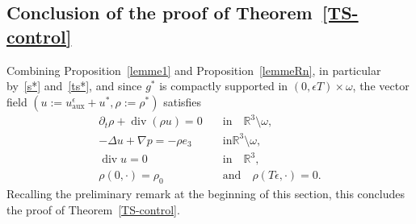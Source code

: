 \documentclass[10pt]{amsart}
\theoremstyle{definition}\newtheorem{defi}[theo]{Definition}\newtheorem{rema}[theo]{Remark}\newtheorem{exam}[theo]{Example}\newtheorem{exem}[theo]{Example}\newtheorem{nota}[theo]{Notation}
\newcommand{\aux}{\mathrm{aux}}
\newcommand{\R}{\mathbb{R}}
\renewcommand{\div}{\operatorname{div}}
\newcommand{\eps}{\epsilon}
\begin{document}
\subsection{Conclusion of the proof of Theorem~\ref{TS-control}}

Combining Proposition~\ref{lemme1} and Proposition~\ref{lemmeRn}, in particular by~\eqref{s*} and~\eqref{ts*}, and since $g^*$ is compactly supported in $(0,\eps T)\times \omega$, the vector field $(u:= u^\eps_\aux+u^*,\rho :=\rho^*)$ satisfies
\begin{align*}
\partial_t \rho+ \div (\rho u)= 0 \quad &\text{in} \quad \R^3 \setminus \omega,
\\ -\Delta u + \nabla p = - \rho e_3 \quad &\text{in} \R^3 \setminus \omega,\\
\div u = 0
\quad &\text{in} \quad \R^3,\\
\rho(0,\cdot)=\rho_0 \quad &\text{and} \quad
\rho(T\eps,\cdot)=0.
\end{align*}
Recalling the preliminary remark at the beginning of this section, this concludes the proof of Theorem~\ref{TS-control}.
\end{document}
